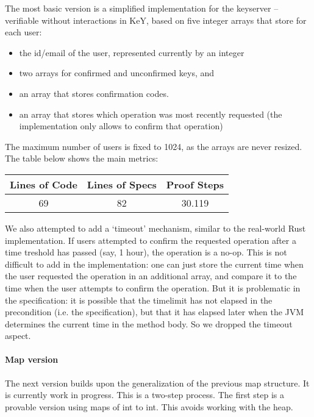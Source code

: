 \documentclass{llncs}
\begin{document}
The most basic version is a simplified implementation for the keyserver -- verifiable without interactions in KeY, based on five integer arrays that store for each user:

\begin{itemize}
\item the id/email of the user, represented currently by an integer
\item two arrays for confirmed and unconfirmed keys, and
\item an array that stores confirmation codes.
\item an array that stores which operation was most recently requested (the implementation only allows to confirm that operation)
\end{itemize}
The maximum number of users is fixed to 1024, as the arrays are never resized. The table below shows the main metrics:

\begin{center}
\begin{tabular}{ |c|c|c| } 
 \hline
 Lines of Code & Lines of Specs & Proof Steps \\
 \hline
 69 & 82 & 30.119 \\
 \hline
\end{tabular}
\end{center}



We also attempted to add a `timeout' mechanism, similar to the real-world Rust implementation.
If users attempted to confirm the requested operation after a time treshold has passed (say, 1 hour), the operation is a no-op.
This is not difficult to add in the implementation: one can just store the current time when the user requested the operation in an additional array, and compare it to the time when the user attempts to confirm the operation. But it is problematic in the specification: it is possible that the timelimit has not elapsed in the precondition (i.e. the specification), but that it has elapsed later when the JVM determines the current time in the method body.
So we dropped the timeout aspect.

\paragraph{Map version}

The next version builds upon the generalization of the previous map structure.
It is currently work in progress. This is a two-step process. The first step is
a provable version using maps of int to int. This avoids working with the heap.
\end{document}
